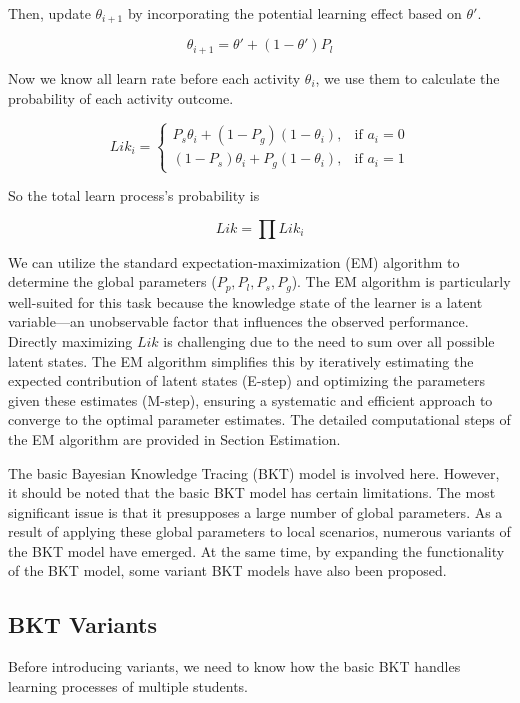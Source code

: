 \documentclass{article}
\begin{document}
Then, update \(\theta_{i+1}\) by incorporating the potential learning effect based on \(\theta'\).

\[
\theta_{i+1} = \theta' + (1 - \theta') P_l    
\]

Now we know all learn rate before each activity \(\theta_i\), we use them to calculate the probability of each activity outcome.

\[
    Lik_i = 
    \begin{cases} 
        P_s \theta_{i} + (1 - P_g) (1 - \theta_i), & \text{if } a_i = 0 \\[10pt]
        (1 - P_s) \theta_{i} + P_g (1 - \theta_i), & \text{if } a_i = 1 
    \end{cases}
\]

So the total learn process's probability is

\[
    Lik = \prod Lik_i
\]

We can utilize the standard expectation-maximization (EM) algorithm to determine the global parameters (\(P_p, P_l, P_s, P_g\)). The EM algorithm is particularly well-suited for this task because the knowledge state of the learner is a latent variable—an unobservable factor that influences the observed performance. Directly maximizing $Lik$ is challenging due to the need to sum over all possible latent states. The EM algorithm simplifies this by iteratively estimating the expected contribution of latent states (E-step) and optimizing the parameters given these estimates (M-step), ensuring a systematic and efficient approach to converge to the optimal parameter estimates. The detailed computational steps of the EM algorithm are provided in Section Estimation.

The basic Bayesian Knowledge Tracing (BKT) model is involved here. However, it should be noted that the basic BKT model has certain limitations. The most significant issue is that it presupposes a large number of global parameters. As a result of applying these global parameters to local scenarios, numerous variants of the BKT model have emerged. At the same time, by expanding the functionality of the BKT model, some variant BKT models have also been proposed.

\subsection{BKT Variants}

Before introducing variants, we need to know how the basic BKT handles learning processes of multiple students.
\end{document}
